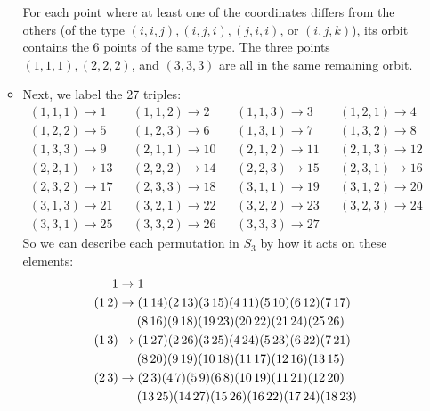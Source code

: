 \documentclass{article}
\begin{document}
\begin{enumerate}[itemsep=0em,label=(\alph*)]
\begin{itemize}[itemsep=0em]
            For each point where at least one of the coordinates differs from the others (of the type $(i, i, j), (i, j, i), (j, i, i)$, or $(i, j, k)$), its orbit contains the 6 points of the same type. The three points $(1, 1, 1), (2, 2, 2)$, and $(3, 3, 3)$ are all in the same remaining orbit.
            \item Next, we label the 27 triples:
            \begin{align*}
                (1, 1, 1) \rightarrow 1 & & (1, 1, 2) \rightarrow 2 & & (1, 1, 3) \rightarrow 3 & & (1, 2, 1) \rightarrow 4 \\
                (1, 2, 2) \rightarrow 5 & & (1, 2, 3) \rightarrow 6 & & (1, 3, 1) \rightarrow 7 & & (1, 3, 2) \rightarrow 8 \\
                (1, 3, 3) \rightarrow 9 & & (2, 1, 1) \rightarrow 10 & & (2, 1, 2) \rightarrow 11 & & (2, 1, 3) \rightarrow 12 \\
                (2, 2, 1) \rightarrow 13 & & (2, 2, 2) \rightarrow 14 & & (2, 2, 3) \rightarrow 15 & & (2, 3, 1) \rightarrow 16 \\
                (2, 3, 2) \rightarrow 17 & & (2, 3, 3) \rightarrow 18 & & (3, 1, 1) \rightarrow 19 & & (3, 1, 2) \rightarrow 20 \\
                (3, 1, 3) \rightarrow 21 & & (3, 2, 1) \rightarrow 22 & & (3, 2, 2) \rightarrow 23 & & (3, 2, 3) \rightarrow 24 \\
                (3, 3, 1) \rightarrow 25 & & (3, 3, 2) \rightarrow 26 & & (3, 3, 3) \rightarrow 27
            \end{align*}
            So we can describe each permutation in $S_3$ by how it acts on these elements:
            \begin{align*}
                1 &\rightarrow 1 \\
                (1\,2) &\rightarrow (1\,14)(2\,13)(3\,15)(4\,11)(5\,10)(6\,12)(7\,17)\\ &\hspace{1.5em}(8\,16)(9\,18)(19\,23)(20\,22)(21\,24)(25\,26) \\
                (1\,3) &\rightarrow (1\,27)(2\,26)(3\,25)(4\,24)(5\,23)(6\,22)(7\,21)\\ &\hspace{1.5em}(8\,20)(9\,19)(10\,18)(11\,17)(12\,16)(13\,15) \\
                (2\,3) &\rightarrow (2\,3)(4\,7)(5\,9)(6\,8)(10\,19)(11\,21)(12\,20)\\ &\hspace{1.5em}(13\,25)(14\,27)(15\,26)(16\,22)(17\,24)(18\,23) \\

\end{align*}
\end{itemize}
\end{enumerate}
\end{document}
